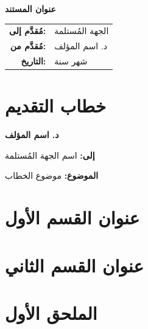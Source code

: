 \documentclass[11pt,a4paper]{article}
\begin{document}
\begin{titlepage}
\centering
\vspace*{2cm}
{\Huge\bfseries عنوان المستند\par}
\vspace{1.5cm}
{\large
\begin{tabular}{rl}
\textbf{مُقدَّم إلى:} & الجهة المُستلمة\\
\textbf{مُقدَّم من:} & د. اسم المؤلف\\
\textbf{التاريخ:} & شهر سنة\\
\end{tabular}\par}
\vfill
\end{titlepage}

\newpage
\setcounter{page}{2}

\section*{خطاب التقديم}

\begin{flushright}
\textbf{د. اسم المؤلف}
\end{flushright}

\textbf{إلى:} اسم الجهة المُستلمة

\textbf{الموضوع:} موضوع الخطاب


\newpage

\section*{عنوان القسم الأول}


\newpage

\section*{عنوان القسم الثاني}


\newpage

\section*{الملحق الأول}

\end{document}
